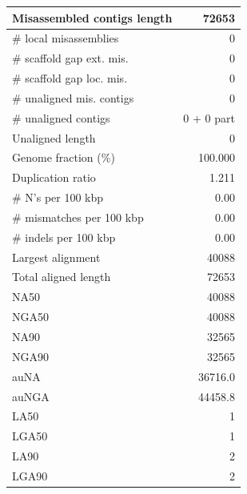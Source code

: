 \documentclass[12pt,a4paper]{article}
\begin{document}
\begin{table}[ht]
\begin{center}
\begin{tabular}{|l*{1}{|r}|}
Misassembled contigs length & 72653 \\ \hline
\# local misassemblies & 0 \\ \hline
\# scaffold gap ext. mis. & 0 \\ \hline
\# scaffold gap loc. mis. & 0 \\ \hline
\# unaligned mis. contigs & 0 \\ \hline
\# unaligned contigs & 0 + 0 part \\ \hline
Unaligned length & 0 \\ \hline
Genome fraction (\%) & 100.000 \\ \hline
Duplication ratio & 1.211 \\ \hline
\# N's per 100 kbp & 0.00 \\ \hline
\# mismatches per 100 kbp & 0.00 \\ \hline
\# indels per 100 kbp & 0.00 \\ \hline
Largest alignment & 40088 \\ \hline
Total aligned length & 72653 \\ \hline
NA50 & 40088 \\ \hline
NGA50 & 40088 \\ \hline
NA90 & 32565 \\ \hline
NGA90 & 32565 \\ \hline
auNA & 36716.0 \\ \hline
auNGA & 44458.8 \\ \hline
LA50 & 1 \\ \hline
LGA50 & 1 \\ \hline
LA90 & 2 \\ \hline
LGA90 & 2 \\ \hline
\end{tabular}
\end{center}
\end{table}
\end{document}
